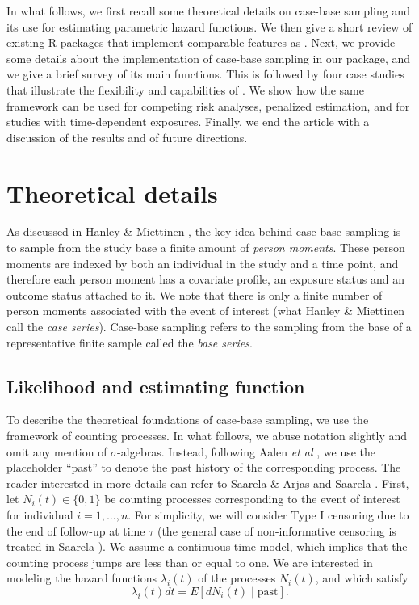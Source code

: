In what follows, we first recall some theoretical details on case-base
sampling and its use for estimating parametric hazard functions. We then
give a short review of existing \textsf{R} packages that implement
comparable features as . Next, we provide some details
about the implementation of case-base sampling in our package, and we
give a brief survey of its main functions. This is followed by four case
studies that illustrate the flexibility and capabilities of
. We show how the same framework can be used for competing
risk analyses, penalized estimation, and for studies with time-dependent
exposures. Finally, we end the article with a discussion of the results
and of future directions.

\hypertarget{theory}{%
\section{Theoretical details}\label{theory}}

As discussed in Hanley \& Miettinen \citeyearpar{hanley2009fitting}, the
key idea behind case-base sampling is to sample from the study base a
finite amount of \emph{person moments}. These person moments are indexed
by both an individual in the study and a time point, and therefore each
person moment has a covariate profile, an exposure status and an outcome
status attached to it. We note that there is only a finite number of
person moments associated with the event of interest (what Hanley \&
Miettinen call the \emph{case series}). Case-base sampling refers to the
sampling from the base of a representative finite sample called the
\emph{base series}.

\hypertarget{likelihood-and-estimating-function}{%
\subsection{Likelihood and estimating
function}\label{likelihood-and-estimating-function}}

To describe the theoretical foundations of case-base sampling, we use
the framework of counting processes. In what follows, we abuse notation
slightly and omit any mention of \(\sigma\)-algebras. Instead, following
Aalen \emph{et al} \citeyearpar{aalen2008survival}, we use the
placeholder ``past'' to denote the past history of the corresponding
process. The reader interested in more details can refer to Saarela \&
Arjas \citeyearpar{saarela2015non} and Saarela
\citeyearpar{saarela2016case}. First, let \(N_{i}(t) \in \{0, 1\}\) be
counting processes corresponding to the event of interest for individual
\(i=1, \ldots,n\). For simplicity, we will consider Type I censoring due
to the end of follow-up at time \(\tau\) (the general case of
non-informative censoring is treated in Saarela
\citeyearpar{saarela2016case}). We assume a continuous time model, which
implies that the counting process jumps are less than or equal to one.
We are interested in modeling the hazard functions \(\lambda_{i}(t)\) of
the processes \(N_i(t)\), and which satisfy
\[\lambda_{i}(t) dt = E[dN_{i}(t)\mid \mathrm{past}].\]

